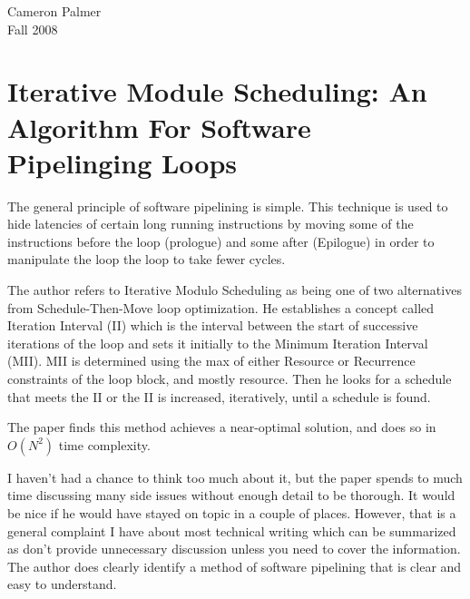 \documentclass[12pt,twoside,letterpaper]{article}
\begin{document}
Cameron Palmer \\
Fall 2008

\section*{Iterative Module Scheduling: An Algorithm For Software Pipelinging Loops}

The general principle of software pipelining is simple. This technique is used to hide latencies of certain long running instructions by moving some of the instructions before the loop (prologue) and some after (Epilogue) in order to manipulate the loop the loop to take fewer cycles. 

The author refers to Iterative Modulo Scheduling as being one of two alternatives from Schedule-Then-Move loop optimization. He establishes a concept called Iteration Interval (II) which is the interval between the start of successive iterations of the loop and sets it initially to the Minimum Iteration Interval (MII). MII is determined using the max of either Resource or Recurrence constraints of the loop block, and mostly resource. Then he looks for a schedule that meets the II or the II is increased, iteratively, until a schedule is found.

The paper finds this method achieves a near-optimal solution, and does so in $O(N^2)$ time complexity.

I haven't had a chance to think too much about it, but the paper spends to much time discussing many side issues without enough detail to be thorough. It would be nice if he would have stayed on topic in a couple of places. However, that is a general complaint I have about most technical writing which can be summarized as don't provide unnecessary discussion unless you need to cover the information. The author does clearly identify a method of software pipelining that is clear and easy to understand.
\end{document}
